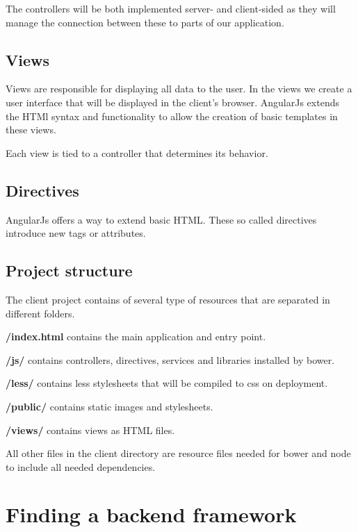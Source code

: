 The controllers will be both implemented server- and client-sided as
they will manage the connection between these to parts of our
application.

\subsection{Views}\label{views}

Views are responsible for displaying all data to the user. In the views
we create a user interface that will be displayed in the client's
browser. AngularJs extends the HTMl syntax and functionality to allow
the creation of basic templates in these views.

Each view is tied to a controller that determines its behavior.

\subsection{Directives}\label{directives}

AngularJs offers a way to extend basic HTML. These so called directives
introduce new tags or attributes.

\subsection{Project structure}\label{project-structure}

The client project contains of several type of resources that are
separated in different folders.

\textbf{/index.html} contains the main application and entry point.

\textbf{/js/} contains controllers, directives, services and libraries
installed by bower.

\textbf{/less/} contains less stylesheets that will be compiled to css
on deployment.

\textbf{/public/} contains static images and stylesheets.

\textbf{/views/} contains views as HTML files.

All other files in the client directory are resource files needed for
bower and node to include all needed dependencies.

\newpage
\section{Finding a backend framework}\label{finding-a-backend-framework}

